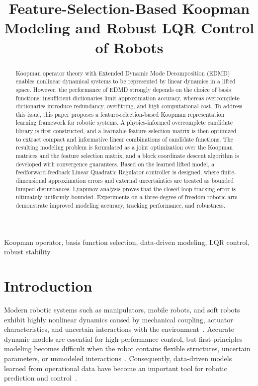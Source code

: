 \documentclass[letterpaper,10pt,conference]{ieeeconf}
\title{\LARGE \bf
Feature-Selection-Based Koopman Modeling and Robust LQR Control of Robots
}
\author{\rule{0pt}{2.5ex}}
\begin{document}
\maketitle
\thispagestyle{empty}
\pagestyle{empty}

\begin{abstract}
Koopman operator theory with Extended Dynamic Mode Decomposition (EDMD) enables nonlinear dynamical systems to be represented by linear dynamics in a lifted space. However, the performance of EDMD strongly depends on the choice of basis functions: insufficient dictionaries limit approximation accuracy, whereas overcomplete dictionaries introduce redundancy, overfitting, and high computational cost. To address this issue, this paper proposes a feature-selection-based Koopman representation learning framework for robotic systems. A physics-informed overcomplete candidate library is first constructed, and a learnable feature selection matrix is then optimized to extract compact and informative linear combinations of candidate functions. The resulting modeling problem is formulated as a joint optimization over the Koopman matrices and the feature selection matrix, and a block coordinate descent algorithm is developed with convergence guarantees. Based on the learned lifted model, a feedforward-feedback Linear Quadratic Regulator controller is designed, where finite-dimensional approximation errors and external uncertainties are treated as bounded lumped disturbances. Lyapunov analysis proves that the closed-loop tracking error is ultimately uniformly bounded. Experiments on a three-degree-of-freedom robotic arm demonstrate improved modeling accuracy, tracking performance, and robustness.
\end{abstract}

\begin{keywords}
Koopman operator, basis function selection, data-driven modeling, LQR control, robust stability
\end{keywords}



\section{Introduction}
Modern robotic systems such as manipulators, mobile robots,
and soft robots exhibit highly nonlinear dynamics caused by mechanical
coupling, actuator characteristics, and uncertain interactions with the
environment~\cite{Brunton2022,DellaSantina2023}. Accurate dynamic models are
essential for high-performance control, but first-principles modeling becomes
difficult when the robot contains flexible structures, uncertain parameters, or
unmodeled interactions~\cite{Mamakoukas2021TRO}. Consequently,
data-driven models learned from operational data have become an important tool
for robotic prediction and control~\cite{Brunke2022,Tang2025survey,LiSu2026TCST,LiEtAl2026TCYB}.
\end{document}
